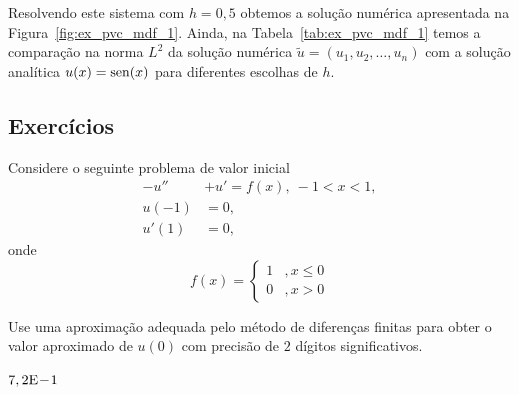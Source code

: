 \begin{ex}
Resolvendo este sistema com $h=0,5$ obtemos a solução numérica apresentada na Figura~\ref{fig:ex_pvc_mdf_1}. Ainda, na Tabela~\ref{tab:ex_pvc_mdf_1} temos a comparação na norma $L^2$ da solução numérica $\tilde{u} = (u_1, u_2, \dotsc, u_n)$ com a solução analítica $u(x)=\operatorname{sen}(x)$ para diferentes escolhas de $h$.









\end{ex}

\subsection*{Exercícios}

\begin{exer}
Considere o seguinte problema de valor inicial
  \begin{align}
    -u'' &+ u' = f(x),~-1<x<1,\\
    u(-1)&=0,\\
    u'(1)&=0,
  \end{align}
  onde
  \begin{equation}
    f(x) = \left\{
      \begin{array}{ll}
        1 &, x\leq 0\\
        0 &, x>0
      \end{array}
    \right.
  \end{equation}
\end{exer}
Use uma aproximação adequada pelo método de diferenças finitas para obter o valor aproximado de $u(0)$ com precisão de $2$ dígitos significativos.
\begin{resp}
  $7,2\mathrm{E}\!-\!1$
\end{resp}
